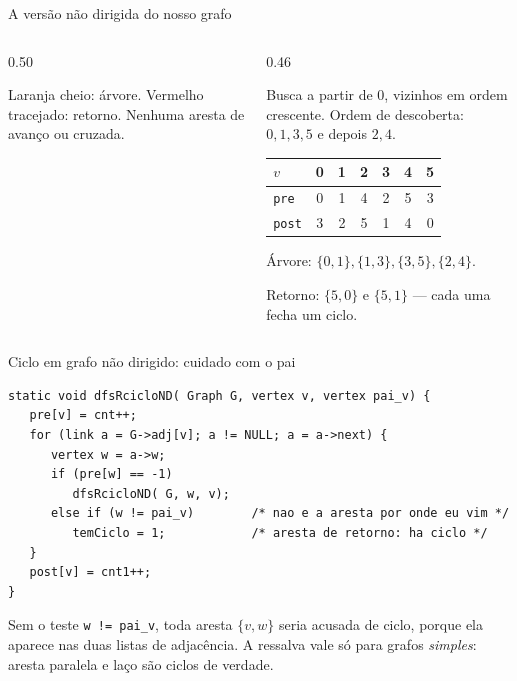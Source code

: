 \documentclass[aspectratio=169]{beamer}
\begin{document}
\begin{frame}{A versão não dirigida do nosso grafo}
  \begin{columns}[T]
    \begin{column}{0.50\textwidth}
      \begin{center}
      \end{center}
      \vspace{-4pt}
      {\scriptsize Laranja cheio: árvore. Vermelho tracejado: retorno.
      Nenhuma aresta de avanço ou cruzada.}
    \end{column}
    \begin{column}{0.46\textwidth}
      {\scriptsize
      Busca a partir de 0, vizinhos em ordem crescente. Ordem de descoberta:
      $0, 1, 3, 5$ e depois $2, 4$.

      \medskip
      \begin{tabular}{lcccccc}
        \toprule
        $v$ & 0 & 1 & 2 & 3 & 4 & 5 \\
        \midrule
        \texttt{pre}  & 0 & 1 & 4 & 2 & 5 & 3 \\
        \texttt{post} & 3 & 2 & 5 & 1 & 4 & 0 \\
        \bottomrule
      \end{tabular}

      \medskip
      Árvore: $\{0,1\}, \{1,3\}, \{3,5\}, \{2,4\}$.

      Retorno: $\{5,0\}$ e $\{5,1\}$ --- cada uma fecha um ciclo.}
    \end{column}
  \end{columns}
\end{frame}

\begin{frame}[fragile]{Ciclo em grafo não dirigido: cuidado com o pai}
\begin{lstlisting}
static void dfsRcicloND( Graph G, vertex v, vertex pai_v) {
   pre[v] = cnt++;
   for (link a = G->adj[v]; a != NULL; a = a->next) {
      vertex w = a->w;
      if (pre[w] == -1)
         dfsRcicloND( G, w, v);
      else if (w != pai_v)        /* nao e a aresta por onde eu vim */
         temCiclo = 1;            /* aresta de retorno: ha ciclo */
   }
   post[v] = cnt1++;
}
\end{lstlisting}
  {\scriptsize Sem o teste \texttt{w != pai\_v}, toda aresta $\{v,w\}$ seria
  acusada de ciclo, porque ela aparece nas duas listas de adjacência. A
  ressalva vale só para grafos \emph{simples}: aresta paralela e laço são
  ciclos de verdade.}
\end{frame}
\end{document}
